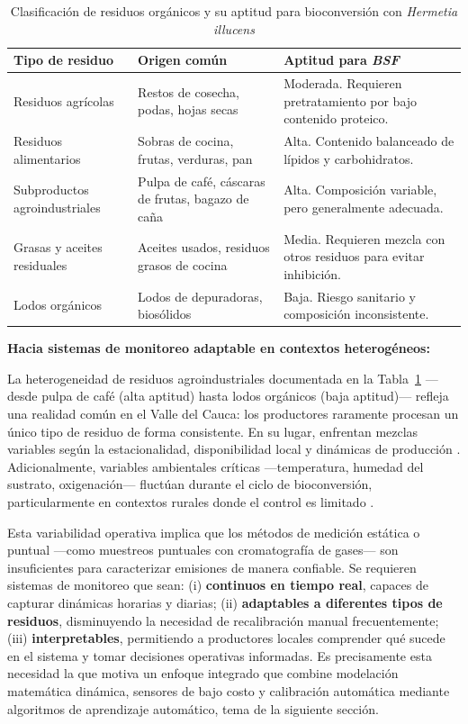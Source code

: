 \begin{table}[H]
\centering
\caption{Clasificación de residuos orgánicos y su aptitud para bioconversión con \textit{Hermetia illucens}}
\label{tab:residuos_BSF}
\begin{tabular}{|p{4cm}|p{5cm}|p{5cm}|}
\hline
\textbf{Tipo de residuo} & \textbf{Origen común} & \textbf{Aptitud para \textit{BSF}} \\ \hline
Residuos agrícolas & Restos de cosecha, podas, hojas secas & Moderada. Requieren pretratamiento por bajo contenido proteico. \\ \hline
Residuos alimentarios & Sobras de cocina, frutas, verduras, pan & Alta. Contenido balanceado de lípidos y carbohidratos. \\ \hline
Subproductos agroindustriales & Pulpa de café, cáscaras de frutas, bagazo de caña & Alta. Composición variable, pero generalmente adecuada. \\ \hline
Grasas y aceites residuales & Aceites usados, residuos grasos de cocina & Media. Requieren mezcla con otros residuos para evitar inhibición. \\ \hline
Lodos orgánicos & Lodos de depuradoras, biosólidos & Baja. Riesgo sanitario y composición inconsistente. \\ \hline
\end{tabular}
\end{table}

\textbf{Hacia sistemas de monitoreo adaptable en contextos heterogéneos:}

La heterogeneidad de residuos agroindustriales documentada en la Tabla~\ref{tab:residuos_BSF} 
—desde pulpa de café (alta aptitud) hasta lodos orgánicos (baja aptitud)— refleja una realidad 
común en el Valle del Cauca: los productores raramente procesan un único tipo de residuo de forma 
consistente. En su lugar, enfrentan mezclas variables según la estacionalidad, disponibilidad local 
y dinámicas de producción \parencite{elsayedConversionProteinrichWaste2024,brunoValorizationOrganicWaste2025}. 
Adicionalmente, variables ambientales críticas —temperatura, humedad del sustrato, oxigenación— 
fluctúan durante el ciclo de bioconversión, particularmente en contextos rurales donde el control 
es limitado \parencite{bekkerImpactSubstrateMoisture2021a,rossiEstimatingDynamicsGreenhouse2024}. 

Esta variabilidad operativa implica que los métodos de medición estática o puntual —como 
muestreos puntuales con cromatografía de gases— son insuficientes para caracterizar emisiones 
de manera confiable. Se requieren sistemas de monitoreo que sean: (i) \textbf{continuos en tiempo 
real}, capaces de capturar dinámicas horarias y diarias; (ii) \textbf{adaptables a diferentes tipos 
de residuos}, disminuyendo la necesidad de recalibración manual frecuentemente; (iii) \textbf{interpretables}, 
permitiendo a productores locales comprender qué sucede en el sistema y tomar decisiones operativas 
informadas. Es precisamente esta necesidad la que motiva un enfoque integrado que combine 
modelación matemática dinámica, sensores de bajo costo y calibración automática mediante algoritmos 
de aprendizaje automático, tema de la siguiente sección.

